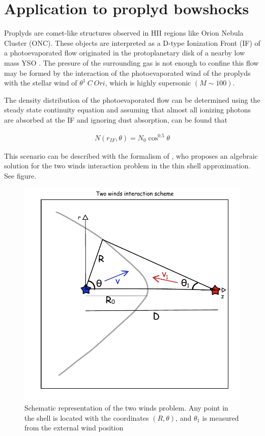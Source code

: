 \section{Application to proplyd bowshocks}
\label{sec:application}

Proplyds are comet-like structures observed in HII regions like Orion Nebula Cluster (ONC). 
These objects are interpreted as a D-type Ionization Front (IF) of a photoevaporated flow 
originated in the protoplanetary disk of a nearby low mass YSO \citep{Johnstone:1998}.
The presure of the surrounding gas is not enough to confine this flow \citep{HA:1998}
may be formed by the interaction of the photoevaporated wind of the proplyds with the stellar wind of $\theta^1~C~Ori$, which is highly supersonic $(M \sim 100)$. 

The density distribution of the photoevaporated flow can be determined using the steady state continuity equation and assuming that almost all ionizing photons are absorbed at the IF \citep{HA:1998} and ignoring dust absorption, can be found that

\begin{align}
N(r_{IF},\theta) = N_0 \cos^{0.5}\theta
\label{eq:nprop}
\end{align}

This scenario can be described with the formalism of \citep{Canto:1996}, who proposes an algebraic solution for the two winds interaction problem in the thin shell approximation. See figure.

\begin{figure}
\includegraphics[width=\linewidth]{2winds-scheme}
\caption{Schematic representation of the two winds problem. Any point in the shell is located with the coordinates
$(R,\theta)$, and $\theta_1$ is measured from the external wind position}
\label{fig:2-winds}
\end{figure}

